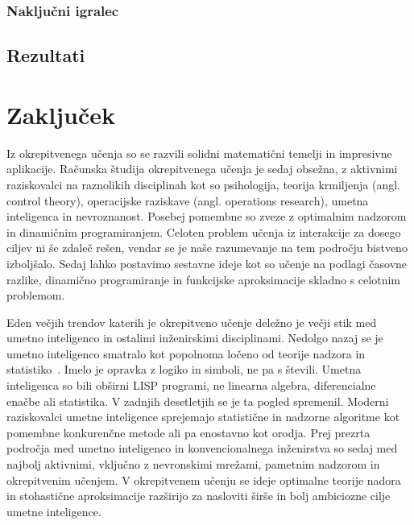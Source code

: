 \documentclass[a4paper, oneside, 12pt]{report}
\begin{document}
\subsection{Naključni igralec}
\section{Rezultati}

\chapter{Zaključek}
\thispagestyle{fancy}
Iz okrepitvenega učenja so se razvili solidni matematični temelji in impresivne aplikacije. Računska študija okrepitvenega učenja je sedaj obsežna, z aktivnimi raziskovalci na raznolikih disciplinah kot so psihologija, teorija krmiljenja (angl. control theory), operacijske raziskave (angl. operations research), umetna inteligenca in nevroznanost. Posebej pomembne so zveze z optimalnim nadzorom in dinamičnim programiranjem. Celoten problem učenja iz interakcije za dosego ciljev ni še zdaleč rešen, vendar se je naše razumevanje na tem področju bistveno izboljšalo. Sedaj lahko postavimo sestavne ideje kot so učenje na podlagi časovne razlike, dinamično programiranje in funkcijske aproksimacije skladno s celotnim problemom.

Eden večjih trendov katerih je okrepitveno učenje deležno je večji stik med umetno inteligenco in ostalimi inženirskimi disciplinami. Nedolgo nazaj se je umetno inteligenco smatralo kot popolnoma ločeno od teorije nadzora in statistiko~\cite{ReinforcementLearningAnIntroduction}. Imelo je opravka z logiko in simboli, ne pa s števili. Umetna inteligenca so bili obširni LISP programi, ne linearna algebra, diferencialne enačbe ali statistika. V zadnjih desetletjih se je ta pogled spremenil. Moderni raziskovalci umetne inteligence sprejemajo statistične in nadzorne algoritme kot pomembne konkurenčne metode ali pa enostavno kot orodja. Prej prezrta področja med umetno inteligenco in konvencionalnega inženirstva so sedaj med najbolj aktivnimi, vključno z nevronskimi mrežami, pametnim nadzorom in okrepitvenim učenjem. V okrepitvenem učenju se ideje optimalne teorije nadora in stohastične aproksimacije razširijo za nasloviti širše in bolj ambiciozne cilje umetne inteligence.
\end{document}
